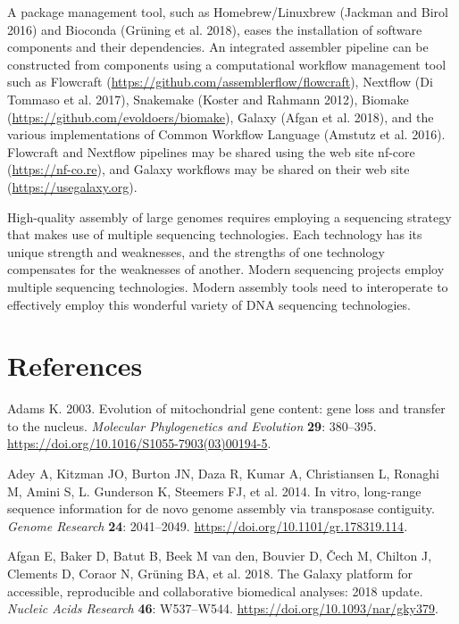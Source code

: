 \documentclass[
  12pt,
  oneside,
  openany]{book}
\begin{document}
A package management tool, such as Homebrew/Linuxbrew (Jackman and Birol 2016) and Bioconda (Grüning et al. 2018), eases the installation of software components and their dependencies. An integrated assembler pipeline can be constructed from components using a computational workflow management tool such as Flowcraft (\url{https://github.com/assemblerflow/flowcraft}), Nextflow (Di Tommaso et al. 2017), Snakemake (Koster and Rahmann 2012), Biomake (\url{https://github.com/evoldoers/biomake}), Galaxy (Afgan et al. 2018), and the various implementations of Common Workflow Language (Amstutz et al. 2016). Flowcraft and Nextflow pipelines may be shared using the web site nf-core (\url{https://nf-co.re}), and Galaxy workflows may be shared on their web site (\url{https://usegalaxy.org}).

High-quality assembly of large genomes requires employing a sequencing strategy that makes use of multiple sequencing technologies. Each technology has its unique strength and weaknesses, and the strengths of one technology compensates for the weaknesses of another. Modern sequencing projects employ multiple sequencing technologies. Modern assembly tools need to interoperate to effectively employ this wonderful variety of DNA sequencing technologies.

\chapter*{References}

\hypertarget{refs}{}
\leavevmode\hypertarget{ref-Adams_2003}{}%
Adams K. 2003. Evolution of mitochondrial gene content: gene loss and transfer to the nucleus. \emph{Molecular Phylogenetics and Evolution} \textbf{29}: 380--395. \url{https://doi.org/10.1016/S1055-7903(03)00194-5}.

\leavevmode\hypertarget{ref-Adey_2014}{}%
Adey A, Kitzman JO, Burton JN, Daza R, Kumar A, Christiansen L, Ronaghi M, Amini S, L. Gunderson K, Steemers FJ, et al. 2014. In vitro, long-range sequence information for de novo genome assembly via transposase contiguity. \emph{Genome Research} \textbf{24}: 2041--2049. \url{https://doi.org/10.1101/gr.178319.114}.

\leavevmode\hypertarget{ref-Afgan_2018}{}%
Afgan E, Baker D, Batut B, Beek M van den, Bouvier D, Čech M, Chilton J, Clements D, Coraor N, Grüning BA, et al. 2018. The Galaxy platform for accessible, reproducible and collaborative biomedical analyses: 2018 update. \emph{Nucleic Acids Research} \textbf{46}: W537--W544. \url{https://doi.org/10.1093/nar/gky379}.
\end{document}
